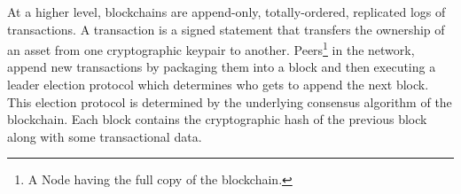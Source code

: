 	At a higher level, blockchains are append-only, totally-ordered, replicated logs of transactions\cite{bonneau2015research}. A transaction is a signed statement that transfers the ownership of an asset from one cryptographic keypair to another. Peers\footnote{A Node having the full copy of the blockchain.} in the network, append new transactions by packaging them into a block and then executing a leader election protocol which determines who gets to append the next block\cite{nelson2016extending}. This election protocol is determined by the underlying consensus algorithm of the blockchain. Each block contains the cryptographic hash of the previous block along with some transactional data.